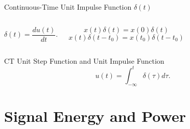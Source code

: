 \begin{frame}[plain]{Continuous-Time Unit Impulse Function $\delta(t)$}
    \begin{columns}[t]
        {
            {
                {
                    \centering
                    
                }
            }
        }
        {
            \begin{equation}
                \delta(t) = \frac{du(t)}{dt}.
            \end{equation}
            {
                {
                    \centering
                    
                }
                \begin{equation*}
                    x(t)\delta(t) = x(0)\delta(t)
                \end{equation*}
                \begin{equation*}
                    x(t)\delta(t -t_0) = x(t_0)\delta(t-t_0)
                \end{equation*}

            }
        }
    \end{columns}




\end{frame}

\begin{frame}[plain]{CT Unit Step Function and Unit Impulse Function}
    \begin{equation}
        u(t) = \int_{-\infty}^{t}\delta(\tau)d\tau.
    \end{equation}
        {
            {
                \centering
                
            }
        }
\end{frame}



\section{Signal Energy and Power}


